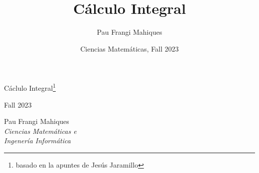\documentclass[a4paper,11pt,final]{article}
\title{Cálculo Integral}
\date{Ciencias Matemáticas, Fall 2023}
\author{Pau Frangi Mahiques}
\begin{document}
\begin{titlepage}
    \centering\Large\null\vfill

    {\Huge Cáclulo Integral\footnote{basado en la apuntes de Jesús Jaramillo}}\\ 
    \vspace{1em}

    Fall 2023\\
    \vskip8cm

    Pau Frangi Mahiques\\

    \emph{Ciencias Matemáticas e\\Ingenería Informática}\\
    \vskip4cm
\end{titlepage}

\newpage
\pagestyle{plain}    
\tableofcontents
\newpage


\end{document}
